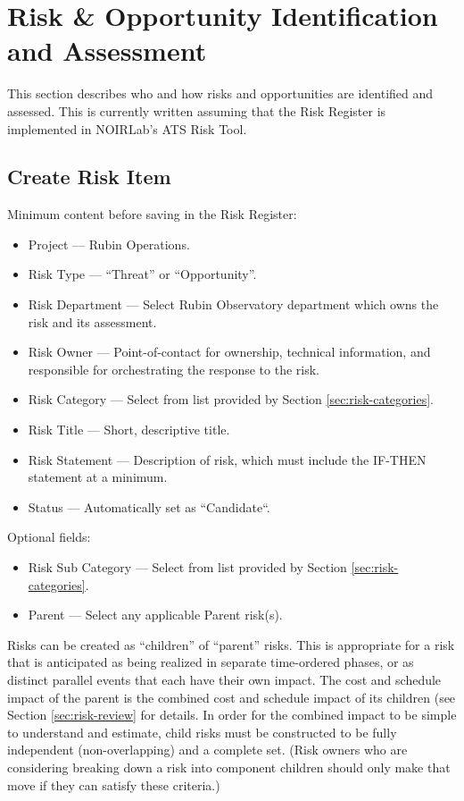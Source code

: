 \section{Risk \& Opportunity Identification and Assessment}
\label{sec:id-assess}

This section describes who and how risks and opportunities are identified and assessed.
This is currently written assuming that the Risk Register is implemented in NOIRLab's ATS Risk Tool.

\subsection{Create Risk Item}

Minimum content before saving in the Risk Register:
\begin{itemize}
	\item Project --- Rubin Operations.
	\item Risk Type --- ``Threat'' or ``Opportunity''.
	\item Risk Department --- Select Rubin Observatory department which owns the risk and its assessment.
	\item Risk Owner --- Point-of-contact for ownership, technical information, and responsible for orchestrating the response to the risk.
	\item Risk Category --- Select from list provided by Section \ref{sec:risk-categories}.
	\item Risk Title --- Short, descriptive title.
	\item Risk Statement --- Description of risk, which must include the IF-THEN statement at a minimum.
	\item Status --- Automatically set as ``Candidate``.
\end{itemize}

Optional fields:
\begin{itemize}
	\item Risk Sub Category --- Select from list provided by Section \ref{sec:risk-categories}.
	\item Parent --- Select any applicable Parent risk(s).
\end{itemize}

Risks can be created as ``children'' of ``parent'' risks.
This is appropriate for a risk that is anticipated as being realized in separate time-ordered phases, or as distinct parallel events that each have their own impact.
The cost and schedule impact of the parent is the combined cost and schedule impact of its children (see Section \ref{sec:risk-review} for details.
In order for the combined impact to be simple to understand and estimate, child risks must be constructed to be fully independent (non-overlapping) and a complete set.
(Risk owners who are considering breaking down a risk into component children should only make that move if they can satisfy these criteria.)

